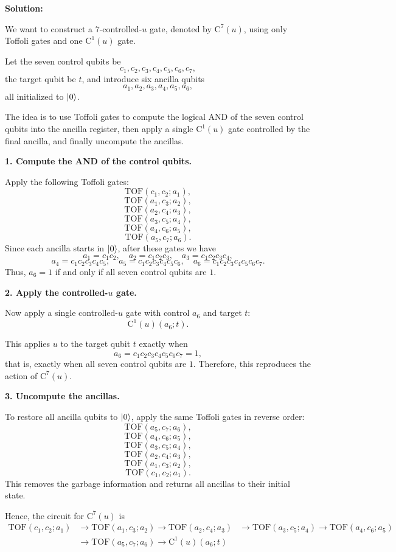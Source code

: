 \documentclass[11pt]{article}
\newenvironment{solution}
{\par\noindent\textbf{Solution:}\par}
{\vspace{1em}}
\begin{document}
\begin{solution}
We want to construct a \(7\)-controlled-\(u\) gate, denoted by \(\mathrm{C^7}(u)\), using only Toffoli gates and one \(\mathrm{C^1}(u)\) gate.

Let the seven control qubits be \[c_1,c_2,c_3,c_4,c_5,c_6,c_7,\]
the target qubit be \(t\), and introduce six ancilla qubits \[a_1,a_2,a_3,a_4,a_5,a_6,\]
all initialized to \(\ket{0}\).

The idea is to use Toffoli gates to compute the logical AND of the seven control qubits into the ancilla register, then apply a single \(\mathrm{C^1}(u)\) gate controlled by the final ancilla, and finally uncompute the ancillas.

\textbf{1. Compute the AND of the control qubits.}

Apply the following Toffoli gates:
\[\mathrm{TOF}(c_1,c_2; a_1),\]
\[\mathrm{TOF}(a_1,c_3; a_2),\]
\[\mathrm{TOF}(a_2,c_4; a_3),\]
\[\mathrm{TOF}(a_3,c_5; a_4),\]
\[\mathrm{TOF}(a_4,c_6; a_5),\]
\[\mathrm{TOF}(a_5,c_7; a_6).\]
Since each ancilla starts in \(\ket{0}\), after these gates we have
\[a_1 = c_1c_2, \quad a_2 = c_1c_2c_3, \quad a_3 = c_1c_2c_3c_4,\]
\[a_4 = c_1c_2c_3c_4c_5, \quad a_5 = c_1c_2c_3c_4c_5c_6,\quad a_6 = c_1c_2c_3c_4c_5c_6c_7.\]
Thus, \(a_6=1\) if and only if all seven control qubits are \(1\).

\textbf{2. Apply the controlled-\(u\) gate.}

Now apply a single controlled-\(u\) gate with control \(a_6\) and target \(t\):
\[\mathrm{C^1}(u)(a_6;t).\]

This applies \(u\) to the target qubit \(t\) exactly when
\[a_6 = c_1c_2c_3c_4c_5c_6c_7 = 1,\]
that is, exactly when all seven control qubits are \(1\). Therefore, this reproduces the action of \(\mathrm{C^7}(u)\).

\textbf{3. Uncompute the ancillas.}

To restore all ancilla qubits to \(\ket{0}\), apply the same Toffoli gates in reverse order:
\[\mathrm{TOF}(a_5,c_7; a_6),\]
\[\mathrm{TOF}(a_4,c_6; a_5),\]
\[\mathrm{TOF}(a_3,c_5; a_4),\]
\[\mathrm{TOF}(a_2,c_4; a_3),\]
\[\mathrm{TOF}(a_1,c_3; a_2),\]
\[\mathrm{TOF}(c_1,c_2; a_1).\]
This removes the garbage information and returns all ancillas to their initial state.

Hence, the circuit for \(\mathrm{C^7}(u)\) is
\[\begin{aligned} \mathrm{TOF}(c_1,c_2; a_1) &\rightarrow \mathrm{TOF}(a_1,c_3; a_2) \rightarrow \mathrm{TOF}(a_2,c_4; a_3) &\rightarrow \mathrm{TOF}(a_3,c_5; a_4) \rightarrow \mathrm{TOF}(a_4,c_6; a_5) \\
&\rightarrow \mathrm{TOF}(a_5,c_7; a_6) \rightarrow \mathrm{C^1}(u)(a_6;t) \end{aligned}\]


\end{solution}
\end{document}
